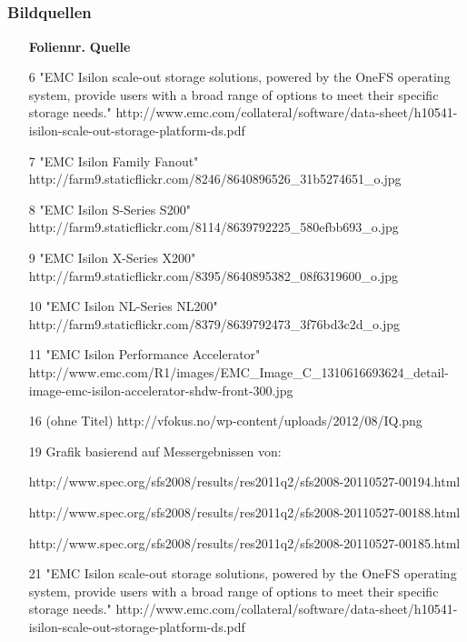 \documentclass{beamer}
\begin{document}
\subsection{}
\begin{frame}[fragile]
  \frametitle{Bildquellen}

  \tiny
  \begin{itemize}
    \item[\textbf{Foliennr.}] \textbf{Quelle}
    \item[6] "EMC Isilon scale-out storage solutions, powered by the OneFS operating system, provide users with a broad range of options to meet their specific storage needs." http://www.emc.com/collateral/software/data-sheet/h10541-isilon-scale-out-storage-platform-ds.pdf
    \item[7] "EMC Isilon Family Fanout" http://farm9.staticflickr.com/8246/8640896526\_31b5274651\_o.jpg
    \item[8] "EMC Isilon S-Series S200" http://farm9.staticflickr.com/8114/8639792225\_580efbb693\_o.jpg
    \item[9] "EMC Isilon X-Series X200" http://farm9.staticflickr.com/8395/8640895382\_08f6319600\_o.jpg
    \item[10] "EMC Isilon NL-Series NL200" http://farm9.staticflickr.com/8379/8639792473\_3f76bd3c2d\_o.jpg 
    \item[11] "EMC Isilon Performance Accelerator" http://www.emc.com/R1/images/EMC\_Image\_C\_1310616693624\_detail-image-emc-isilon-accelerator-shdw-front-300.jpg
    \item[16] (ohne Titel) http://vfokus.no/wp-content/uploads/2012/08/IQ.png
    \item[19] Grafik basierend auf Messergebnissen von:
    \item[] http://www.spec.org/sfs2008/results/res2011q2/sfs2008-20110527-00194.html
    \item[] http://www.spec.org/sfs2008/results/res2011q2/sfs2008-20110527-00188.html
    \item[] http://www.spec.org/sfs2008/results/res2011q2/sfs2008-20110527-00185.html
    \item[21] "EMC Isilon scale-out storage solutions, powered by the OneFS operating system, provide users with a broad range of options to meet their specific storage needs." http://www.emc.com/collateral/software/data-sheet/h10541-isilon-scale-out-storage-platform-ds.pdf 
  \end{itemize}
  
\end{frame}
\end{document}
